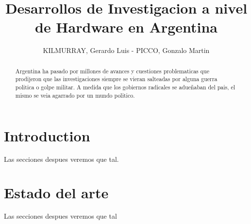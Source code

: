 \documentclass[%
	draft,
%
	notitlepage,
	narroweqnarray,
	inline,
	twoside,
	]{ieee}
\begin{document}
\title[Desarrollos de Investigacion a nivel de Hardware en Argentina]{Desarrollos de Investigacion a nivel de Hardware en Argentina}

 \author[]{KILMURRAY, Gerardo Luis %
 - PICCO, Gonzalo Martin%
 }


\maketitle 
\sloppy

\begin{abstract} 
Argentina ha pasado por millones de avances y cuestiones problematicas que prodijeron que las investigaciones siempre se vieran salteadas por alguna guerra politica o golpe militar. A medida que los gobiernos radicales se adueñaban del pais, el mismo se veia agarrado por un mundo politico.
\end{abstract}


\section{Introduction}
Las secciones despues veremos que tal.

\section{Estado del arte}
Las secciones despues veremos que tal
\end{document}
